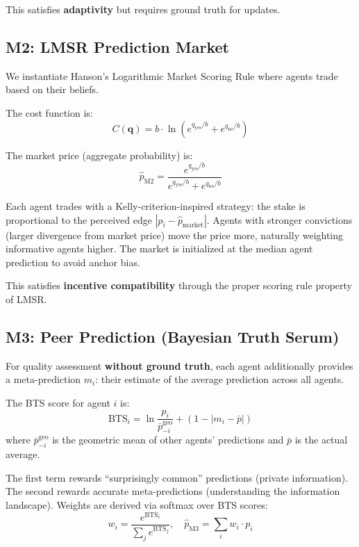 \documentclass[conference]{IEEEtran}
\begin{document}
This satisfies \textbf{adaptivity} but requires ground truth for updates.

\subsection{M2: LMSR Prediction Market}

We instantiate Hanson's Logarithmic Market Scoring Rule \cite{hanson2007logarithmic} where agents trade based on their beliefs.

The cost function is:
\begin{equation}
    C(\mathbf{q}) = b \cdot \ln(e^{q_{\text{yes}}/b} + e^{q_{\text{no}}/b})
\end{equation}

The market price (aggregate probability) is:
\begin{equation}
    \hat{p}_{\text{M2}} = \frac{e^{q_{\text{yes}}/b}}{e^{q_{\text{yes}}/b} + e^{q_{\text{no}}/b}}
\end{equation}

Each agent trades with a Kelly-criterion-inspired strategy: the stake is proportional to the perceived edge $|p_i - \hat{p}_{\text{market}}|$. Agents with stronger convictions (larger divergence from market price) move the price more, naturally weighting informative agents higher. The market is initialized at the median agent prediction to avoid anchor bias.

This satisfies \textbf{incentive compatibility} through the proper scoring rule property of LMSR.

\subsection{M3: Peer Prediction (Bayesian Truth Serum)}

For quality assessment \textbf{without ground truth}, each agent additionally provides a meta-prediction $m_i$: their estimate of the average prediction across all agents.

The BTS score for agent $i$ is:
\begin{equation}
    \text{BTS}_i = \ln\frac{p_i}{\bar{p}_{-i}^{\text{geo}}} + (1 - |m_i - \bar{p}|)
\end{equation}
where $\bar{p}_{-i}^{\text{geo}}$ is the geometric mean of other agents' predictions and $\bar{p}$ is the actual average.

The first term rewards ``surprisingly common'' predictions (private information). The second rewards accurate meta-predictions (understanding the information landscape). Weights are derived via softmax over BTS scores:
\begin{equation}
    w_i = \frac{e^{\text{BTS}_i}}{\sum_j e^{\text{BTS}_j}}, \quad
    \hat{p}_{\text{M3}} = \sum_i w_i \cdot p_i
\end{equation}
\end{document}
